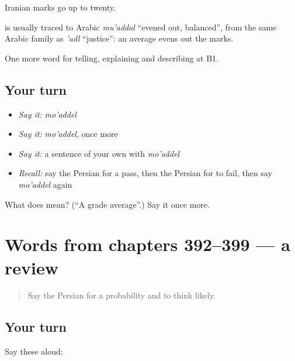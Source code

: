 Iranian marks go up to twenty.

\begin{cousinweb}
\textbf{} is usually traced to Arabic \emph{mu'addal} \textquotedblleft{}evened out, balanced\textquotedblright{}, from the same Arabic family as \emph{'adl} \textquotedblleft{}justice\textquotedblright{}: an average evens out the marks.
\end{cousinweb}

\begin{grammarlens}[title={What you've built}]
One more word for telling, explaining and describing at B1.
\end{grammarlens}

\subsection*{Your turn}
\begin{itemize}
\raggedright
  \item \emph{Say it:} \emph{mo'addel}
  \item \emph{Say it:} \emph{mo'addel}, once more
  \item \emph{Say it:} a sentence of your own with \emph{mo'addel}
  \item \emph{Recall:} say the Persian for a pass, then the Persian for to fail, then say \emph{mo'addel} again
\end{itemize}

\begin{tcolorbox}[breakable,colback=teal!4,colframe=teal!35!black,title={Before you move on}]
What does  mean? (\textquotedblleft{}A grade average\textquotedblright{}.) Say it once more.
\end{tcolorbox}
\section[(dialogue)]{Words from chapters 392–399 — a review}

\label{lesson:FA-R399-review-392-399}



\begin{quote}
Say the Persian for a probability and to think likely.
\end{quote}

\subsection*{Your turn}
Say these aloud:

